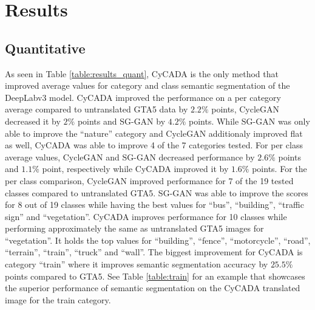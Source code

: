 \newpage

\section{Results}

\subsection{Quantitative}
As seen in Table \ref{table:results_quant}, CyCADA is the only method that improved average values for category and class semantic segmentation of the DeepLabv3 model. CyCADA improved the performance on a per category average compared to untranslated GTA5 data by $2.2\%$ points, CycleGAN decreased it by $2\%$ points and SG-GAN by $4.2\%$ points. While SG-GAN was only able to improve the ``nature'' category and CycleGAN additionaly improved flat as well, CyCADA was able to improve 4 of the 7 categories tested. For per class average values, CycleGAN and SG-GAN decreased performance by $2.6\%$ points and $1.1\%$ point, respectively while CyCADA improved it by $1.6\%$ points. For the per class comparison, CycleGAN improved performance for 7 of the 19 tested classes compared to untranslated GTA5. SG-GAN was able to improve the scores for 8 out of 19 classes while having the best values for ``bus'', ``building'', ``traffic sign'' and ``vegetation''. CyCADA improves performance for 10 classes while performing approximately the same as untranslated GTA5 images for ``vegetation''. It holds the top values for ``building'', ``fence'', ``motorcycle'', ``road'', ``terrain'', ``train'', ``truck'' and ``wall''. The biggest improvement for CyCADA is category ``train'' where it improves semantic segmentation accuracy by $25.5\%$ points compared to GTA5. See Table \ref{table:train} for an example that showcases the superior performance of semantic segmentation on the CyCADA translated image for the train category.

